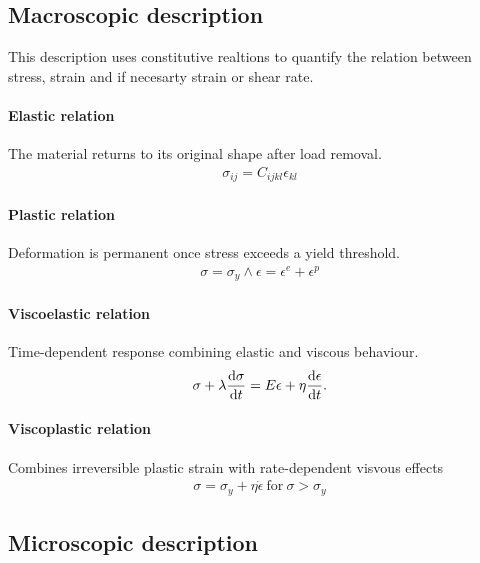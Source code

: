 \subsection{Macroscopic description}

This description uses constitutive realtions to quantify the relation between stress, strain and if necesarty strain or shear rate.


\paragraph{Elastic relation} The material returns to its original shape after load removal.
\begin{gather}
    \sigma_{ij} = C_{ijkl}\epsilon_{kl}
\end{gather}

\paragraph{Plastic relation} Deformation is permanent once stress exceeds a yield threshold.
\begin{gather}
    \sigma = \sigma_y \wedge \epsilon = \epsilon^e+\epsilon^p
\end{gather}

\paragraph{Viscoelastic relation} Time-dependent response combining elastic and viscous behaviour.
\begin{gather}
    \sigma + \lambda\dv{\sigma}{t} = E\epsilon+\eta\dv{\epsilon}{t}.
\end{gather}

\paragraph{Viscoplastic relation} Combines irreversible plastic strain with rate-dependent visvous effects
\begin{gather}
    \sigma = \sigma_y + \eta\dot{\epsilon}\mathrm{~for~}\sigma>\sigma_y
\end{gather}

\subsection{Microscopic description}


